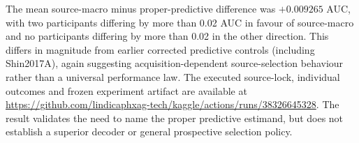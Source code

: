 The mean source-macro minus proper-predictive
difference was $+0.009265$ AUC, with two
participants differing by more than 0.02 AUC
in favour of source-macro and no participants
differing by more than 0.02 in the other direction.
This differs in magnitude from earlier corrected
predictive controls (including Shin2017A), again
suggesting acquisition-dependent source-selection
behaviour rather than a universal performance law.
The executed source-lock, individual outcomes and
frozen experiment artifact are available at
\url{https://github.com/lindicaphxag-tech/kaggle/actions/runs/38326645328}.
The result validates the need to name the
proper predictive estimand, but does not
establish a superior decoder or general prospective
selection policy.
